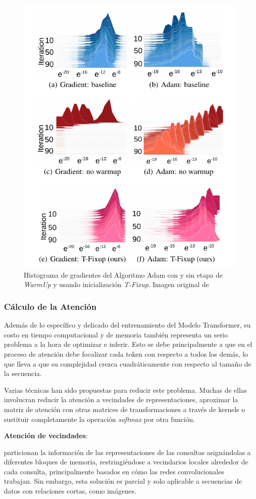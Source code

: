 \begin{figure}[ht!]
    \centering
    \includegraphics[width=0.5 \textwidth]{Chapters/2. Transformer/Figures/transformer/tfixup.png}
    \caption{Histograma de gradientes del Algoritmo Adam con y sin etapa de \textit{WarmUp} y
    usando inicialización \textit{T-Fixup}. Imagen original de \citeauthor{pmlr-v119-huang20f}}
    \label{fig:t-fixup}
\end{figure}

\subsubsection{Cálculo de la Atención}

Además de lo específico y delicado del entrenamiento del Modelo Transformer, su costo en tiempo
computacional y de memoria también representa un serio problema a la hora de optimizar e inferir.
Esto se debe principalmente a que en el proceso de atención debe focalizar cada token con respecto
a todos los demás, lo que lleva a que su complejidad crezca cuadráticamente con respecto al tamaño
de la secuencia.

Varias técnicas han sido propuestas para reducir este problema. Muchas de ellas involucran reducir
la atención a vecindades de representaciones, aproximar la matriz de atención con otras matrices de
transformaciones a través de kernels o sustituir completamente la operación \textit{softmax} por otra función.


\textbf{Atención de vecindades}:

\citeauthor{DBLP:journals/corr/abs-1802-05751} particionan la información de las representaciones de
las consultas asignándolas a diferentes bloques de memoria, restringiéndose a vecindarios locales
alrededor de cada consulta, principalmente basados en cómo las redes convolucionales trabajan. Sin
embargo, esta solución es parcial y solo aplicable a secuencias de datos con relaciones cortas, como
imágenes.

